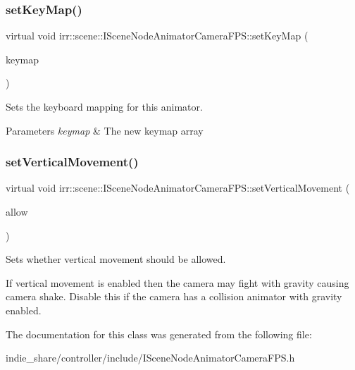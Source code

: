 \subsubsection{\texorpdfstring{set\+Key\+Map()}{setKeyMap()}\hspace{0.1cm}{\footnotesize\ttfamily [2/2]}}
{\footnotesize\ttfamily virtual void irr\+::scene\+::\+I\+Scene\+Node\+Animator\+Camera\+F\+P\+S\+::set\+Key\+Map (\begin{DoxyParamCaption}\item[{const \hyperlink{classirr_1_1core_1_1array}{core\+::array}$<$ \hyperlink{structirr_1_1SKeyMap}{S\+Key\+Map} $>$ \&}]{keymap }\end{DoxyParamCaption})\hspace{0.3cm}{\ttfamily [pure virtual]}}



Sets the keyboard mapping for this animator. 


\begin{DoxyParams}{Parameters}
{\em keymap} & The new keymap array \\
\hline
\end{DoxyParams}
\mbox{\label{classirr_1_1scene_1_1ISceneNodeAnimatorCameraFPS_a56cd5340472cc22e08ff17217af8af89}} 
\subsubsection{\texorpdfstring{set\+Vertical\+Movement()}{setVerticalMovement()}}
{\footnotesize\ttfamily virtual void irr\+::scene\+::\+I\+Scene\+Node\+Animator\+Camera\+F\+P\+S\+::set\+Vertical\+Movement (\begin{DoxyParamCaption}\item[{bool}]{allow }\end{DoxyParamCaption})\hspace{0.3cm}{\ttfamily [pure virtual]}}



Sets whether vertical movement should be allowed. 

If vertical movement is enabled then the camera may fight with gravity causing camera shake. Disable this if the camera has a collision animator with gravity enabled. 

The documentation for this class was generated from the following file\+:\begin{DoxyCompactItemize}
\item 
indie\+\_\+share/controller/include/I\+Scene\+Node\+Animator\+Camera\+F\+P\+S.\+h\end{DoxyCompactItemize}
